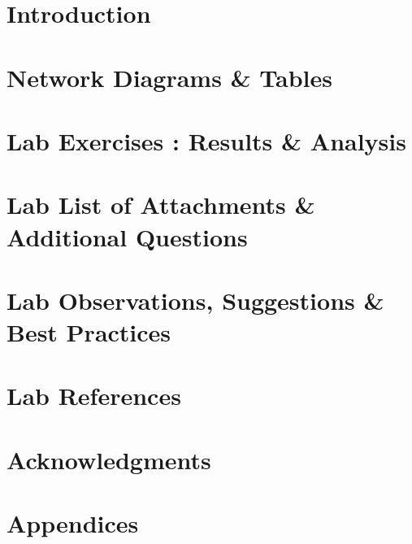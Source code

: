\documentclass{report}
\begin{document}

\tableofcontents
\listoffigures
\listoftables


\newpage
\section{Introduction} \label{sec1}


\newpage
\section{Network Diagrams \& Tables} \label{sec2}


\newpage
\section{Lab Exercises : Results \& Analysis}\label{sec3}


\newpage
\section{Lab List of Attachments \& Additional Questions} \label{sec4}


\section{Lab Observations, Suggestions \& Best Practices} \label{sec5}


\section{Lab References} \label{sec6}


\section{Acknowledgments} \label{sec7}


\newpage
\section{Appendices} \label{sec9}

\end{document}
